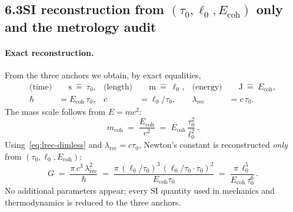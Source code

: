 \documentclass[12pt,a4paper]{article}
\theoremstyle{definition}
\theoremstyle{remark}
\begin{document}
\bigskip

\subsection*{6.3\quad SI reconstruction from $(\tau_0,\ell_0,E_{\mathrm{coh}})$ only and the metrology audit}
\paragraph{Exact reconstruction.}
From the three anchors we obtain, by exact equalities,
\begin{align}
\text{(time)} &\quad \ \mathrm{s} \ \widehat{=}\ \tau_0,
&
\text{(length)} &\quad \ \mathrm{m} \ \widehat{=}\ \ell_0,
&
\text{(energy)} &\quad \ \mathrm{J} \ \widehat{=}\ E_{\mathrm{coh}}, \label{eq:SI-anchors}
\\[4pt]
\hbar &= E_{\mathrm{coh}}\,\tau_0,
&
c &= \ell_0/\tau_0,
&
\lambda_{\mathrm{rec}} &= c\,\tau_0. \label{eq:derived-basics}
\end{align}
The mass scale follows from $E=mc^2$:
\begin{equation}
\label{eq:mcoh}
m_{\mathrm{coh}}
\;=\;
\frac{E_{\mathrm{coh}}}{c^2}
\;=\;
E_{\mathrm{coh}}\,\frac{\tau_0^2}{\ell_0^2}\,.
\end{equation}
Using~\eqref{eq:lrec-dimless} and \(\lambda_{\mathrm{rec}}=c\tau_0\), Newton's constant is reconstructed \emph{only} from \((\tau_0,\ell_0,E_{\mathrm{coh}})\):
\begin{equation}
\label{eq:G-recon}
G
\;=\;
\frac{\pi\,c^3\,\lambda_{\mathrm{rec}}^2}{\hbar}
\;=\;
\frac{\pi\,(\ell_0/\tau_0)^3\,( \ell_0/\tau_0 \cdot \tau_0)^2}{E_{\mathrm{coh}}\tau_0}
\;=\;
\frac{\pi\,\ell_0^5}{E_{\mathrm{coh}}\,\tau_0^6}\,.
\end{equation}
No additional parameters appear; every SI quantity used in mechanics and thermodynamics is reduced to the three anchors.
\end{document}
